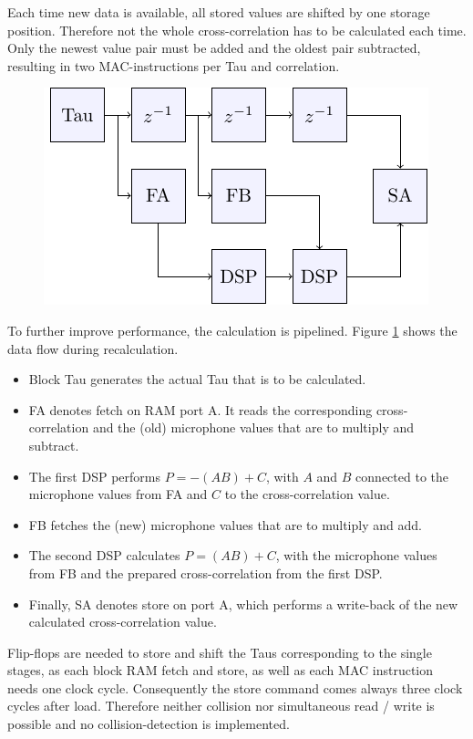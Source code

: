 Each time new data is available, all stored values are shifted by one storage position.
Therefore not the whole cross-correlation has to be calculated each time.
Only the newest value pair must be added and the oldest pair subtracted, resulting in two MAC-instructions per Tau and correlation.

\begin{figure}[htbp]
	\centering
	\includegraphics[scale = 1.5]{block_diagram/xcorr_diag.pdf}
	\label{fig::block_diag}
\end{figure}

To further improve performance, the calculation is pipelined.
Figure \ref{fig::block_diag} shows the data flow during recalculation.

\begin{itemize}
	\item Block Tau generates the actual Tau that is to be calculated.
	\item FA denotes fetch on RAM port A. It reads the corresponding cross-correlation and the (old) 	microphone values that are to multiply and subtract.	
	\item The first DSP performs $P = -(AB)+C$, with $A$ and $B$ connected to the microphone values from FA and $C$ to the cross-correlation value.
	\item FB fetches the (new) microphone values that are to multiply and add.
	\item The second DSP calculates $P = (AB)+C$, with the microphone values from FB and the prepared cross-correlation from the first DSP.
	\item Finally, SA denotes store on port A, which performs a write-back of the new calculated cross-correlation value.
\end{itemize}

Flip-flops are needed to store and shift the Taus corresponding to the single stages, as each block RAM fetch and store, as well as each MAC instruction needs one clock cycle.
Consequently the store command comes always three clock cycles after load.
Therefore neither collision nor simultaneous read / write is possible and no collision-detection is implemented.

